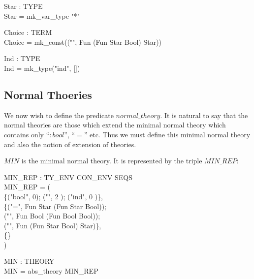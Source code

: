 \documentclass[a4paper,11pt,titlepage]{article}
\begin{document}
\begin{titlepage}
\begin{HOLConst}
\+	\PrNL{}Star\PrNN{} : TYPE\\
\PrPH{}
\+	Star = mk\_var\_type "*"\\
\end{HOLConst}

\begin{HOLConst}
\+	\PrNL{}Choice\PrNN{} : TERM\\
\PrPH{}
\+	Choice = mk\_const(("\MMM{\epsilon}", Fun (Fun Star Bool) Star))\\
\end{HOLConst}

\begin{HOLConst}
\+	\PrNL{}Ind\PrNN{} : TYPE\\
\PrPH{}
\+	Ind = mk\_type("ind", [])\\
\end{HOLConst}

\subsection{Normal Thoeries}
We now wish to define the predicate $normal\_theory$. It is natural
to say that the normal theories are those which extend the minimal
normal theory which contains only ``${:}bool$'', ``$=$'' etc.
Thus we must define this minimal normal theory and also the notion
of extension of theories.

$MIN$ is the minimal normal theory. It is represented
by the triple $MIN\_REP$:
\begin{HOLConst}
\+	\PrNL{}MIN\_REP\PrNN{} : TY\_ENV \MMM{\times} CON\_ENV \MMM{\times} SEQS\\
\PrPH{}
\+	MIN\_REP = (\\
\+		\{("bool", 0); ("\MMM{\rightarrow}",  2 ); ("ind", 0 )\},\\
\+	 	\{("=", Fun Star (Fun Star Bool));\\
\+		 ("\MMM{\Rightarrow}", Fun Bool (Fun Bool Bool));\\
\+		 ("\MMM{\epsilon}", Fun (Fun Star Bool) Star)\},\\
\+	 	\{\}\\
\+	)\\
\end{HOLConst}
\begin{HOLConst}
\+	\PrNL{}MIN\PrNN{} : THEORY\\
\PrPH{}
\+	MIN = abs\_theory MIN\_REP\\
\end{HOLConst}


\end{titlepage}
\end{document}
